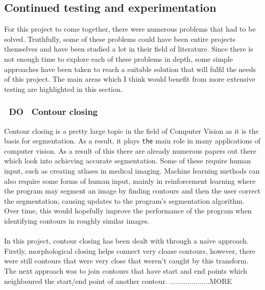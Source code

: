 \documentclass[11pt]{article}
\begin{document}
\subsection{Continued testing and experimentation} 
For this project to come together, there were numerous problems that
had to be solved. Truthfully, some of these problems could have been entire
projects themselves and have been studied a lot in their field of literature.
Since there is not enough time to explore each of these problems in 
depth, some simple approaches have been taken to reach a suitable solution
that will fulfil the needs of this project. The main areas which I think would
benefit from more extensive testing are highlighted in this section.

\subsubsection{~DO~ Contour closing}
Contour closing is a pretty large topic in the field of Computer Vision as 
it is the basis for segmentation. As a result, it plays \texttt{the} main role
in many applications of computer vision. As a result of this there are 
already numerous papers out there which look into achieving accurate segmentation.
Some of these require human input, such as creating atlases in medical imaging.
Machine learning methods can also require some forms of human input, mainly in 
reinforcement learning where the program may segment an image by finding contours 
and then the user correct the segmentation, causing updates to the program's
segmentation algorithm. Over time, this would hopefully improve the performance
of the program when identifying contours in roughly similar images. \\
\\
In this project, contour closing has been dealt with through a naive approach.
Firstly, morphological closing helps connect very cloase contours, however, there
were still contours that were very close that weren't caught by this transform.
The next approach was to join contours that have start and end points which
neighboured the start/end point of another contour.
....................MORE
\end{document}
